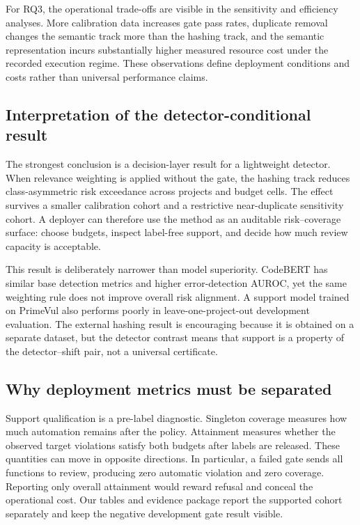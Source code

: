 \documentclass[preprint,12pt]{elsarticle}
\begin{document}
For RQ3, the operational trade-offs are visible in the sensitivity and efficiency analyses. More calibration data increases gate pass rates, duplicate removal changes the semantic track more than the hashing track, and the semantic representation incurs substantially higher measured resource cost under the recorded execution regime. These observations define deployment conditions and costs rather than universal performance claims.

\subsection{Interpretation of the detector-conditional result}

The strongest conclusion is a decision-layer result for a lightweight detector. When relevance weighting is applied without the gate, the hashing track reduces class-asymmetric risk exceedance across projects and budget cells. The effect survives a smaller calibration cohort and a restrictive near-duplicate sensitivity cohort. A deployer can therefore use the method as an auditable risk--coverage surface: choose budgets, inspect label-free support, and decide how much review capacity is acceptable.

This result is deliberately narrower than model superiority. CodeBERT has similar base detection metrics and higher error-detection AUROC, yet the same weighting rule does not improve overall risk alignment. A support model trained on PrimeVul also performs poorly in leave-one-project-out development evaluation. The external hashing result is encouraging because it is obtained on a separate dataset, but the detector contrast means that support is a property of the detector--shift pair, not a universal certificate.

\subsection{Why deployment metrics must be separated}

Support qualification is a pre-label diagnostic. Singleton coverage measures how much automation remains after the policy. Attainment measures whether the observed target violations satisfy both budgets after labels are released. These quantities can move in opposite directions. In particular, a failed gate sends all functions to review, producing zero automatic violation and zero coverage. Reporting only overall attainment would reward refusal and conceal the operational cost. Our tables and evidence package report the supported cohort separately and keep the negative development gate result visible.
\end{document}
